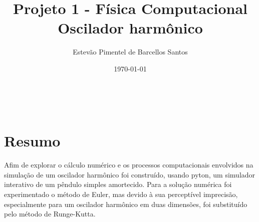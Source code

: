 \documentclass[12pt]{article}
\title{\textbf{\huge Projeto 1 - Física Computacional\\}Oscilador harmônico}
\author{Estevão Pimentel de Barcellos Santos}
\date{\today}
\begin{document}
    \null  %
    \nointerlineskip  %
    \vfill
    \let\snewpage \newpage~
    \let\newpage \relax
    \maketitle
    \let \newpage \snewpage
    \vfill
    \thispagestyle{empty}
    \newpage
    \setcounter{page}{1}
    \section*{Resumo}
    Afim de explorar o cálculo numérico e os processos computacionais envolvidos na simulação de um oscilador
    harmônico foi construído, usando pyton, um simulador interativo de um pêndulo simples amortecido. Para
    a solução numérica foi experimentado o método de Euler, mas devido à sua perceptível imprecisão,
    especialmente para um oscilador harmônico em duas dimensões, foi substituído pelo método de Runge-Kutta.
\end{document}
